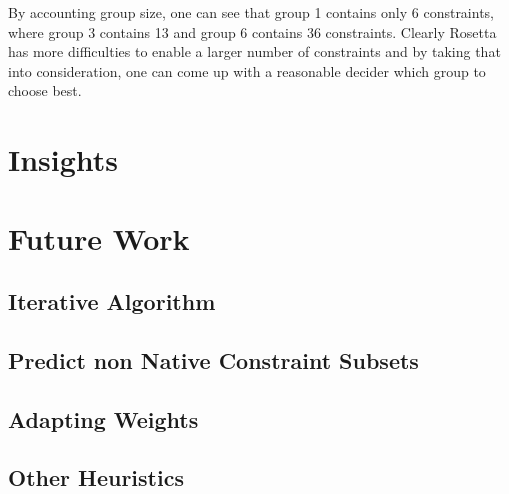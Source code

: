 \documentclass[a4paper, 11pt, parskip=half]{scrartcl}
\begin{document}
By accounting group size, one can see that group 1 contains only 6 constraints, where group 3 contains 13 and group 6 contains 36 constraints. Clearly Rosetta has more difficulties to enable a larger number of constraints and by taking that into consideration, one can come up with a reasonable decider which group to choose best.

\section{Insights}

\section{Future Work}

\subsection{Iterative Algorithm}

\subsection{Predict non Native Constraint Subsets}

\subsection{Adapting Weights}

\subsection{Other Heuristics}
\end{document}
